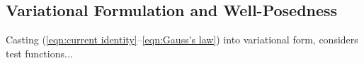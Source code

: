 \subsection*{Variational Formulation and Well-Posedness}
    
    Casting (\ref{eqn:current identity}–\ref{eqn:Gauss's law}) into variational form, \cite{LHF22} considers test functions...
    